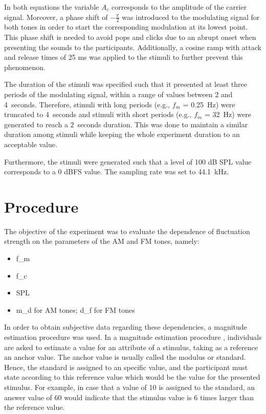 \documentclass[../main.tex]{subfiles}
\begin{document}
In both equations the variable $A_c$ corresponds to the amplitude of the
carrier signal. Moreover, a phase shift of $-\frac{\pi}{2}$ was introduced to
the modulating signal for both tones in order to start the corresponding
modulation at its lowest point. This phase shift is needed to avoid pops and
clicks due to an abrupt onset when presenting the sounds to the participants.
Additionally, a cosine ramp with attack and release times of 25 ms was applied
to the stimuli to further prevent this phenomenon.

The duration of the stimuli was specified such that it presented at least three
periods of the modulating signal, within a range of values between 2 and
4~seconds. Therefore, stimuli with long periods (e.g., $f_m$ = 0.25~Hz) were
truncated to 4~seconds and stimuli with short periods (e.g., $f_m$ = 32~Hz) were
generated to reach a 2~seconds duration. This was done to maintain a similar
duration among stimuli while keeping the whole experiment duration to an
acceptable value.

Furthermore, the stimuli were generated such that a level of 100 dB SPL value
corresponds to a 0 dBFS value. The sampling rate was set to 44.1~kHz.

\section{Procedure}
\label{sec:procedure}


The objective of the experiment was to evaluate the dependence of fluctuation
strength on the parameters of the \gls{AM} and \gls{FM} tones, namely:
\begin{itemize}
  \item \Gls{f_m}
  \item \Gls{f_c}
  \item \Gls{SPL}
  \item \Gls{m_d} for \gls{AM} tones; \gls{d_f} for \gls{FM} tones
\end{itemize}

In order to obtain subjective data regarding these dependencies, a magnitude
estimation procedure was used. In a magnitude estimation procedure
\cite[pp.~9]{Fastl2007Psychoacoustics}, individuals are asked to estimate a
value for an attribute of a stimulus, taking as a reference an anchor value.
The anchor value is usually called the modulus or standard. Hence, the standard
is assigned to an specific value, and the participant must state according to
this reference value which would be the value for the presented stimulus. For
example, in case that a value of 10 is assigned to the standard, an answer value
of 60 would indicate that the stimulus value is 6 times larger than the
reference value.
\end{document}
